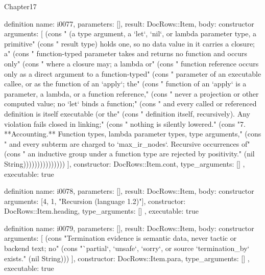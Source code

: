 \begin{lexlean}{Chapter17}
\begin{semanticmodule}
definition{
  name: i0077,
  parameters: [],
  result: DocRows::Item,
  body: constructor{
    arguments: [
      (cons "   (a type argument, a `let`, `nil`, or lambda parameter type, a primitive" (cons "   result type) holds one, so no data value in it carries a closure; a" (cons "   function-typed parameter takes and returns no function and occurs only" (cons "   where a closure may; a lambda or" (cons "   function reference occurs only as a direct argument to a function-typed" (cons "   parameter of an executable callee, or as the function of an `apply`; the" (cons "   function of an `apply` is a parameter, a lambda, or a function reference," (cons "   never a projection or other computed value; no `let` binds a function;" (cons "   and every called or referenced definition is itself executable (or the" (cons "   definition itself, recursively). Any violation fails closed in linking;" (cons "   nothing is silently lowered." (cons "7. **Accounting.** Function types, lambda parameter types, type arguments," (cons "   and every subterm are charged to `max_ir_nodes`. Recursive occurrences of" (cons "   an inductive group under a function type are rejected by positivity." (nil String)))))))))))))))
    ],
    constructor: DocRows::Item.cont,
    type_arguments: []
  },
  executable: true
}

definition{
  name: i0078,
  parameters: [],
  result: DocRows::Item,
  body: constructor{
    arguments: [4, 1, "Recursion (language 1.2)"],
    constructor: DocRows::Item.heading,
    type_arguments: []
  },
  executable: true
}

definition{
  name: i0079,
  parameters: [],
  result: DocRows::Item,
  body: constructor{
    arguments: [
      (cons "Termination evidence is semantic data, never tactic or backend text; no" (cons "`partial`, `unsafe`, `sorry`, or source `termination_by` exists." (nil String)))
    ],
    constructor: DocRows::Item.para,
    type_arguments: []
  },
  executable: true
}


\end{semanticmodule}
\end{lexlean}
